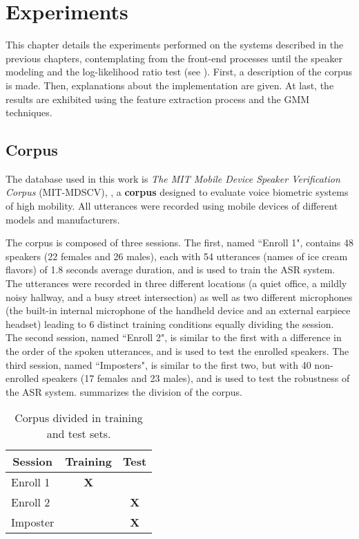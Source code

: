 \chapter{Experiments}
\label{ch:experiments}

This chapter details the experiments performed on the systems described in the previous chapters, contemplating from the front-end processes until the speaker modeling and the log-likelihood ratio test (see ). First, a description of the corpus is made. Then, explanations about the implementation are given. At last, the results are exhibited using the feature extraction process and the GMM techniques.

\section{Corpus}
\label{sec:corpus}

The database used in this work is \emph{The MIT Mobile Device Speaker Verification Corpus} (MIT-MDSCV), , a \textbf{corpus} designed to evaluate voice biometric systems of high mobility. All utterances were recorded using mobile devices of different models and manufacturers.

The corpus is composed of three sessions. The first, named ``Enroll 1", contains 48 speakers (22 females and 26 males), each with 54 utterances (names of ice cream flavors) of 1.8 seconds average duration, and is used to train the ASR system. The utterances were recorded in three different locations (a quiet office, a mildly noisy hallway, and a busy street intersection) as well as two different microphones (the built-in internal microphone of the handheld device and an external earpiece headset) leading to 6 distinct training conditions equally dividing the session. The second session, named ``Enroll 2", is similar to the first with a difference in the order of the spoken utterances, and is used to test the enrolled speakers. The third session, named ``Imposters", is similar to the first two, but with 40 non-enrolled speakers (17 females and 23 males), and is used to test the robustness of the ASR system.  summarizes the division of the corpus.

\begin{table}[h]
    \small
    \centering
    \begin{tabular}{|l|c|c|}
    \hline
    \multicolumn{1}{|c|}{{\bf Session}} & {\bf Training} & {\bf Test} \\ \hline
    Enroll 1                            & {\bf X}        & {\bf }     \\ \hline
    Enroll 2                            & {\bf }         & {\bf X}    \\ \hline
    Imposter                            & {\bf }         & {\bf X}    \\ \hline
    \end{tabular}
    \caption{Corpus divided in training and test sets.}
    \label{tab:corpus-division}
\end{table}

